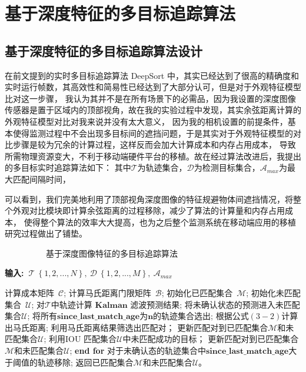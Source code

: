 \section{基于深度特征的多目标追踪算法}
\subsection{基于深度特征的多目标追踪算法设计}
在前文提到的实时多目标追踪算法 DeepSort 中，其实已经达到了很高的精确度和实时运行帧数，其高效性和简易性已经达到了大部分认可，但是对于外观特征模型比对这一步骤，
我认为其并不是在所有场景下的必需品，因为我设置的深度图像传感器是置于区域内的顶部视角，故在我的实验过程中发现，其实余弦距离计算的外观特征模型对比对我来说并没有太大意义，
因为我的相机设置的前提条件，基本使得监测过程中不会出现多目标间的遮挡问题，于是其实对于外观特征模型的对比步骤是较为冗余的计算过程，这样反而会加大计算成本和内存占用成本，
导致所需物理资源变大，不利于移动端硬件平台的移植。故在经过算法改进后，我提出的多目标实时追踪算法如下：
其中$\mathcal{T}$为轨迹集合，$\mathcal{D}$为检测目标集合，$\mathcal{A}_{max}$为最大匹配间隔时间，

可以看到，我们完美地利用了顶部视角深度图像的特征规避物体间遮挡情况，将整个外观对比模块即计算余弦距离的过程移除，减少了算法的计算量和内存占用成本，
使得整个算法的效率大大提高，也为之后整个监测系统在移动端应用的移植研究过程做出了铺垫。

\begin{algorithm}[htpb]
	\caption{\ \ \ \ \ \ \ \ \ \ 基于深度图像特征的多目标追踪算法}
	\fangsong
	\hspace*{0.02in} {\bf 输入:\ $\mathcal{T}\ \left\{1, 2, ..., N \right\},\ \mathcal{D}\ \left\{1, 2, ..., M \right\},\  \mathcal{A}_{max}$} 
	\begin{algorithmic}[1]
		\State 计算成本矩阵\ {\bf $\mathcal{C}$};
		\State 计算马氏距离门限矩阵\ {\bf $\mathcal{B}$};
		\State 初始化已匹配集合\ {\bf $\mathcal{M}$};
		\State 初始化未匹配集合\ {\bf $\mathcal{U}$};
		\State 对{\bf $\mathcal{T}$}中轨迹计算 $\bm{Kalman}$ 滤波预测结果;
		\State 将未确认状态的预测进入未匹配集合$\mathcal{U}$;
		\State 将所有$\bm{since\_last\_match\_age}$为$\bm{n}$的轨迹集合选出;
		\State 根据公式$\left(3 - 2\right)$计算出马氏距离;
		\State 利用马氏距离结果筛选出匹配对；
		\State 更新匹配对到已匹配集合$\mathcal{M}$和未匹配集合$\mathcal{U}$;
		\State 利用IOU 匹配集合$\mathcal{U}$中未匹配成功的目标；
		\State 更新匹配对到已匹配集合$\mathcal{M}$和未匹配集合$\mathcal{U}$;
		\EndFor
		\State \textbf{end for}
		\State 对于未确认态的轨迹集合中$\bm{since\_last\_match\_age}$大于阈值的轨迹移除;
		\State 返回已匹配集合$\mathcal{M}$和未匹配集合$\mathcal{U}$。
	\end{algorithmic}
	\label{algo2}
\end{algorithm}

